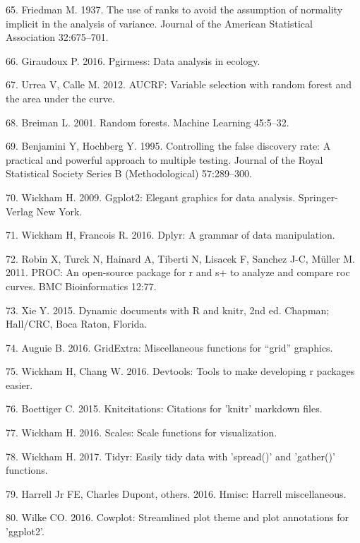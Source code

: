 \documentclass[12pt,]{article}
\begin{document}
\hypertarget{ref-friedman_1937}{}
65. Friedman M. 1937. The use of ranks to avoid the assumption of
normality implicit in the analysis of variance. Journal of the American
Statistical Association 32:675--701.

\hypertarget{ref-pgirmess}{}
66. Giraudoux P. 2016. Pgirmess: Data analysis in ecology.

\hypertarget{ref-AUCRF}{}
67. Urrea V, Calle M. 2012. AUCRF: Variable selection with random forest
and the area under the curve.

\hypertarget{ref-breiman_rf_2001}{}
68. Breiman L. 2001. Random forests. Machine Learning 45:5--32.

\hypertarget{ref-Benjamini_Hochberg_1995}{}
69. Benjamini Y, Hochberg Y. 1995. Controlling the false discovery rate:
A practical and powerful approach to multiple testing. Journal of the
Royal Statistical Society Series B (Methodological) 57:289--300.

\hypertarget{ref-ggplot2}{}
70. Wickham H. 2009. Ggplot2: Elegant graphics for data analysis.
Springer-Verlag New York.

\hypertarget{ref-dplyr}{}
71. Wickham H, Francois R. 2016. Dplyr: A grammar of data manipulation.

\hypertarget{ref-pROC}{}
72. Robin X, Turck N, Hainard A, Tiberti N, Lisacek F, Sanchez J-C,
Müller M. 2011. PROC: An open-source package for r and s+ to analyze and
compare roc curves. BMC Bioinformatics 12:77.

\hypertarget{ref-knitr2015}{}
73. Xie Y. 2015. Dynamic documents with R and knitr, 2nd ed. Chapman;
Hall/CRC, Boca Raton, Florida.

\hypertarget{ref-gridExtra}{}
74. Auguie B. 2016. GridExtra: Miscellaneous functions for ``grid''
graphics.

\hypertarget{ref-devtools}{}
75. Wickham H, Chang W. 2016. Devtools: Tools to make developing r
packages easier.

\hypertarget{ref-knitcitations}{}
76. Boettiger C. 2015. Knitcitations: Citations for 'knitr' markdown
files.

\hypertarget{ref-scales}{}
77. Wickham H. 2016. Scales: Scale functions for visualization.

\hypertarget{ref-tidyr}{}
78. Wickham H. 2017. Tidyr: Easily tidy data with 'spread()' and
'gather()' functions.

\hypertarget{ref-Hmisc}{}
79. Harrell Jr FE, Charles Dupont, others. 2016. Hmisc: Harrell
miscellaneous.

\hypertarget{ref-cowplot}{}
80. Wilke CO. 2016. Cowplot: Streamlined plot theme and plot annotations
for 'ggplot2'.
\end{document}
